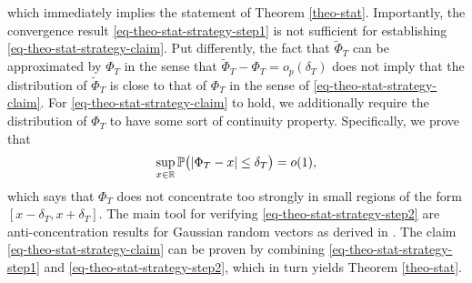 which immediately implies the statement of Theorem \ref{theo-stat}. Importantly, the convergence result \eqref{eq-theo-stat-strategy-step1} is not sufficient for establishing \eqref{eq-theo-stat-strategy-claim}. Put differently, the fact that $\widetilde{\Phi}_T$ can be approximated by $\Phi_T$ in the sense that $\widetilde{\Phi}_T - \Phi_T = o_p(\delta_T)$ does not imply that the distribution of $\widetilde{\Phi}_T$ is close to that of $\Phi_T$ in the sense of \eqref{eq-theo-stat-strategy-claim}. For \eqref{eq-theo-stat-strategy-claim} to hold, we additionally require the distribution of $\Phi_T$ to have some sort of continuity property. Specifically, we prove that 
\begin{equation}\label{eq-theo-stat-strategy-step2}
\sup_{x \in \mathbb{R}} \mathbb{P} \big( |\Phi_T - x| \le \delta_T \big) = o(1),
\end{equation}
which says that $\Phi_T$ does not concentrate too strongly in small regions of the form $[x-\delta_T,x+\delta_T]$. The main tool for verifying \eqref{eq-theo-stat-strategy-step2} are anti-concentration results for Gaussian random vectors as derived in \cite{Chernozhukov2015}. The claim \eqref{eq-theo-stat-strategy-claim} can be proven by combining \eqref{eq-theo-stat-strategy-step1} and \eqref{eq-theo-stat-strategy-step2}, which in turn yields Theorem \ref{theo-stat}. 


